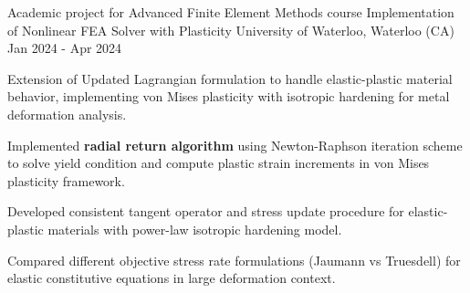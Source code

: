 
\cventry
{Academic project for Advanced Finite Element Methods course}
{Implementation of Nonlinear FEA Solver with Plasticity}
{University of Waterloo, Waterloo (CA)}
{Jan 2024 - Apr 2024}
{
    Extension of Updated Lagrangian formulation to handle elastic-plastic material behavior, implementing von Mises plasticity with isotropic hardening for metal deformation analysis.
    \newline
    \vspace{4mm}
    \begin{cvitems}
        \item {Implemented \textbf{radial return algorithm} using Newton-Raphson iteration scheme to solve yield condition and compute plastic strain increments in von Mises plasticity framework.}
        \item {Developed consistent tangent operator and stress update procedure for elastic-plastic materials with power-law isotropic hardening model.}
        \item {Compared different objective stress rate formulations (Jaumann vs Truesdell) for elastic constitutive equations in large deformation context.}
    \end{cvitems}
}

